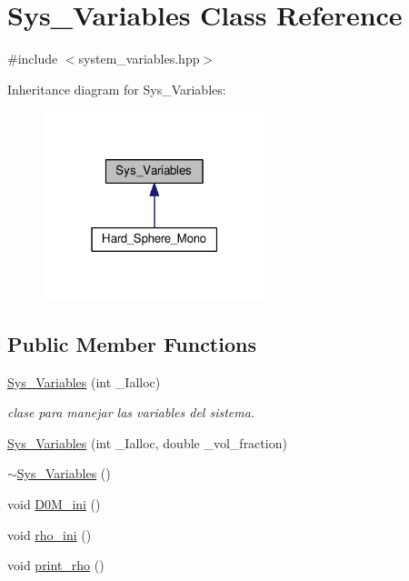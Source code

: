 \hypertarget{class_sys___variables}{}\section{Sys\+\_\+\+Variables Class Reference}
\label{class_sys___variables}


{\ttfamily \#include $<$system\+\_\+variables.\+hpp$>$}



Inheritance diagram for Sys\+\_\+\+Variables\+:\nopagebreak
\begin{figure}[H]
\begin{center}
\leavevmode
\includegraphics[width=183pt]{class_sys___variables__inherit__graph}
\end{center}
\end{figure}
\subsection*{Public Member Functions}
\begin{DoxyCompactItemize}
\item 
\hyperlink{class_sys___variables_a512a43134876c755d8d997c383418aee}{Sys\+\_\+\+Variables} (int \+\_\+\+Ialloc)
\begin{DoxyCompactList}\small\item\em clase para manejar las variables del sistema. \end{DoxyCompactList}\item 
\hyperlink{class_sys___variables_afa2f5564f9940b003b4c95be514cd3fe}{Sys\+\_\+\+Variables} (int \+\_\+\+Ialloc, double \+\_\+vol\+\_\+fraction)
\item 
\hyperlink{class_sys___variables_a2605ef8df9f122d99b01a9bfeef474f3}{$\sim$\+Sys\+\_\+\+Variables} ()
\item 
void \hyperlink{class_sys___variables_ac075bdb65cc5776bb8ba0688387d54d9}{D0\+M\+\_\+ini} ()
\item 
void \hyperlink{class_sys___variables_a69ff8eb3b16b5d9820362e6e2a5d163d}{rho\+\_\+ini} ()
\item 
void \hyperlink{class_sys___variables_a0e56275b66ce4fa26bc194a931ce6bd6}{print\+\_\+rho} ()
\end{DoxyCompactItemize}
